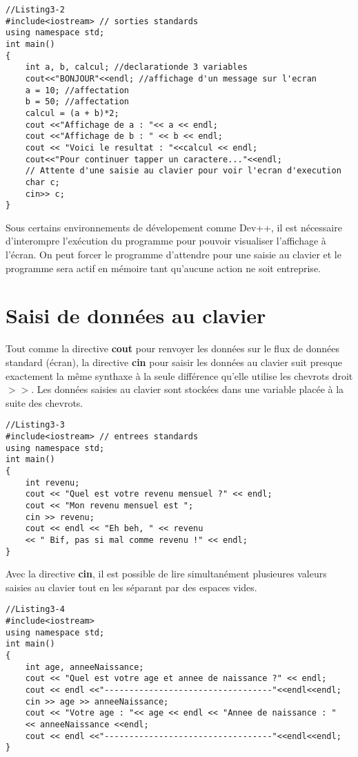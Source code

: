 \documentclass[a4paper, oneside,11pt]{book}
\begin{document}
\begin{lstlisting}
//Listing3-2
#include<iostream> // sorties standards
using namespace std;
int main()
{
    int a, b, calcul; //declarationde 3 variables
    cout<<"BONJOUR"<<endl; //affichage d'un message sur l'ecran
    a = 10; //affectation
    b = 50; //affectation
    calcul = (a + b)*2;
    cout <<"Affichage de a : "<< a << endl;
    cout <<"Affichage de b : " << b << endl;
    cout << "Voici le resultat : "<<calcul << endl;
    cout<<"Pour continuer tapper un caractere..."<<endl;
    // Attente d'une saisie au clavier pour voir l'ecran d'execution
    char c;
    cin>> c;
}
\end{lstlisting}
Sous certains environnements de d\'evelopement comme Dev++, il est n\'ecessaire d'interompre l'ex\'ecution du programme pour pouvoir visualiser l'affichage 
\`a l'\'ecran. On peut forcer le programme d'attendre pour une saisie au clavier et le programme sera actif en m\'emoire tant qu'aucune action  ne soit entreprise.

\section{Saisi de donn\'ees au clavier}

Tout comme la directive \textbf{cout} pour renvoyer les donn\'ees sur le flux de donn\'ees standard (\'ecran), la directive \textbf{cin}
pour saisir les donn\'ees au clavier suit presque exactement
la m\^eme synthaxe \`a la seule diff\'erence qu'elle utilise les chevrots droit $ >> $. Les donn\'ees saisies au clavier sont stock\'ees dans une variable plac\'ee \`a 
la suite des chevrots.

\begin{lstlisting}
//Listing3-3
#include<iostream> // entrees standards
using namespace std;
int main()
{
    int revenu;
    cout << "Quel est votre revenu mensuel ?" << endl;
    cout << "Mon revenu mensuel est ";
    cin >> revenu;
    cout << endl << "Eh beh, " << revenu
    << " Bif, pas si mal comme revenu !" << endl;
}
\end{lstlisting}
Avec la directive \textbf{cin}, il est possible de lire simultan\'ement plusieures valeurs saisies au clavier tout en les s\'eparant par des espaces vides.

\begin{lstlisting}
//Listing3-4
#include<iostream> 
using namespace std;
int main()
{
    int age, anneeNaissance;
    cout << "Quel est votre age et annee de naissance ?" << endl;
    cout << endl <<"----------------------------------"<<endl<<endl;
    cin >> age >> anneeNaissance;
    cout << "Votre age : "<< age << endl << "Annee de naissance : "
    << anneeNaissance <<endl;
    cout << endl <<"----------------------------------"<<endl<<endl;
}
\end{lstlisting}
\end{document}
